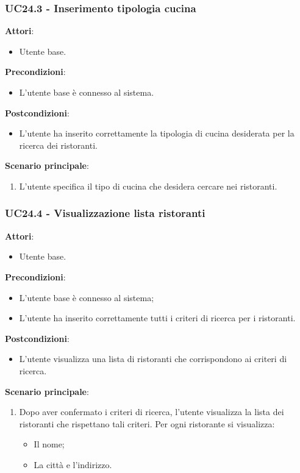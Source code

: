 \subsubsection{UC24.3 - Inserimento tipologia cucina
}\label{usecase:24_3}
\textbf{Attori}:
\begin{itemize}
    \item Utente base.
\end{itemize}
\textbf{Precondizioni}:
\begin{itemize}
    \item L'utente base è connesso al sistema.
\end{itemize}
\textbf{Postcondizioni}:
\begin{itemize}
    \item L'utente ha inserito correttamente la tipologia di cucina desiderata per la ricerca dei ristoranti.
\end{itemize}
\textbf{Scenario principale}:
\begin{enumerate}
    \item L'utente specifica il tipo di cucina che desidera cercare nei ristoranti.
\end{enumerate}


\subsubsection{UC24.4 - Visualizzazione lista ristoranti
}\label{usecase:24_4}
\textbf{Attori}:
\begin{itemize}
    \item Utente base.
\end{itemize}
\textbf{Precondizioni}:
\begin{itemize}
    \item L'utente base è connesso al sistema;
    \item L'utente ha inserito correttamente tutti i criteri di ricerca per i ristoranti.
\end{itemize}
\textbf{Postcondizioni}:
\begin{itemize}
    \item L'utente visualizza una lista di ristoranti che corrispondono ai criteri di ricerca.
\end{itemize}
\textbf{Scenario principale}:
\begin{enumerate}
    \item Dopo aver confermato i criteri di ricerca, l'utente visualizza la lista dei ristoranti che rispettano tali criteri. Per ogni ristorante si visualizza:
    \begin{itemize}
        \item Il nome;
        \item La città e l'indirizzo.
    \end{itemize}
\end{enumerate}



\newpage